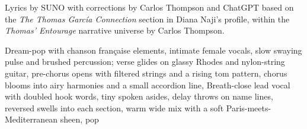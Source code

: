 
\begin{notes}
Lyrics by SUNO with corrections by Carlos Thompson and ChatGPT %
based on the \emph{The Thomas García Connection} section in Diana Naji's profile, %
within the \emph{Thomas’ Entourage} narrative universe by Carlos Thompson.
\end{notes}
\begin{style}
Dream-pop with chanson française elements, intimate female vocals, slow swaying pulse and brushed percussion; %
verse glides on glassy Rhodes and nylon-string guitar, pre-chorus opens with filtered strings and a rising tom pattern, %
chorus blooms into airy harmonies and a small accordion line, Breath-close lead vocal with doubled hook words, %
tiny spoken asides, delay throws on name lines, reversed swells into each section, %
warm wide mix with a soft Paris-meets-Mediterranean sheen, pop
\end{style}
